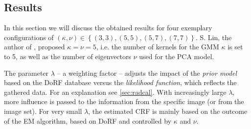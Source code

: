 \subsection{Results}
\label{subsec:syntheticDataResults}

In this section we will discuss the obtained results for four exemplary configurations of $(\kappa, \nu) \in \left\{ (3,3), (5,5), (5,7), (7,7) \right\}$. S. Lin, the author of \cite{Lin04radiometriccalibration}, proposed $\kappa = \nu = 5$, \hbox{i.e.} the number of kernels for the GMM $\kappa$ is set to 5, as well as the number of eigenvectors $\nu$ used for the PCA model.

The parameter $\lambda$ -- a weighting factor -- adjusts the impact of the \emph{prior model} based on the DoRF database versus the \emph{likelihood function}, which reflects the gathered data. For an explanation see \autoref{sec:radcal}. With increasingly large $\lambda$, more influence is passed to the information from the specific image (or from the image set). For very small $\lambda$, the estimated CRF is mainly based on the outcome of the EM algorithm, based on DoRF and controlled by $\kappa$ and $\nu$. 
